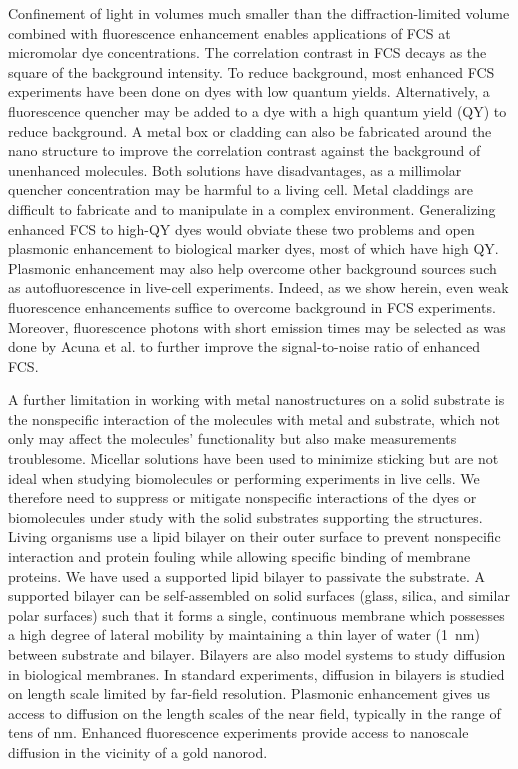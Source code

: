 Confinement of light in volumes much smaller than the diffraction-limited volume combined with fluorescence enhancement enables applications of FCS at micromolar dye concentrations.
The correlation contrast in FCS decays as the square of the background intensity.\cite{fradin2003fluorescence}
To reduce background, most enhanced FCS experiments have been done on dyes with low quantum yields.\cite{kinkhabwala2012fluorescence,estrada200810000}
Alternatively, a fluorescence quencher may be added to a dye with a high quantum yield (QY) to reduce background.\cite{punj2013a,punj2013gold}
A metal box or cladding\cite{ghenuche2015matching} can also be fabricated around the nano structure to improve the correlation contrast against the background of unenhanced molecules.
Both solutions have disadvantages, as a millimolar quencher concentration may be harmful to a living cell.
Metal claddings are difficult to fabricate and to manipulate in a complex environment.
Generalizing enhanced FCS to high-QY dyes would obviate these two problems and open plasmonic enhancement to biological marker dyes, most of which have high QY.
Plasmonic enhancement may also help overcome other background sources such as autofluorescence in live-cell experiments.
Indeed, as we show herein, even weak fluorescence enhancements suffice to overcome background in FCS experiments.
Moreover, fluorescence photons with short emission times may be selected as was done by Acuna et al.\cite{acuna2012fluorescence} to further improve the signal-to-noise ratio of enhanced FCS.


A further limitation in working with metal nanostructures on a solid substrate is the nonspecific interaction of the molecules with metal and substrate, which not only may affect the molecules’ functionality but also make measurements troublesome.\cite{kinkhabwala2012fluorescence,yuan2013thousandfold,zhang2009gold}
Micellar solutions have been used to minimize sticking but are not ideal when studying biomolecules or performing experiments in live cells. 
We therefore need to suppress or mitigate nonspecific interactions of the dyes or biomolecules under study with the solid substrates supporting the structures.
Living organisms use a lipid bilayer on their outer surface to prevent nonspecific interaction and protein fouling while allowing specific binding of membrane proteins.\cite{zhang2009gold,cooper2000cell}
We have used a supported lipid bilayer to passivate the substrate.\cite{persson2012lipidbased,ller2012single,lohmuller2011supported}
A supported bilayer can be self-assembled on solid surfaces (glass, silica, and similar polar surfaces) such that it forms a single, 
continuous membrane which possesses a high degree of lateral mobility by maintaining a thin layer of water (\SI{1}{\nm}) between substrate and bilayer.\cite{sackmann1996supported,CASTELLANA2006429,cremer1999formation,richter2006formation} 
Bilayers are also model systems to study diffusion in biological membranes.
In standard experiments, diffusion in bilayers is studied on length scale limited by far-field resolution. Plasmonic enhancement gives us access to diffusion on the length scales of the near field, typically in the range of tens of nm.
Enhanced fluorescence experiments provide access to nanoscale diffusion in the vicinity of a gold nanorod.


